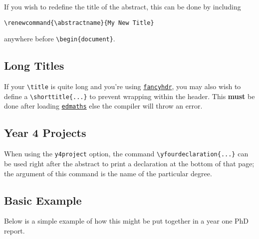 \documentclass[12pt]{article}
\newcommand\pkg[1]{\href{https://www.ctan.org/pkg/#1}{\color{teal}\lstinline{#1}}}
\newcommand\key[1]{{\color{orange}\lstinline|#1|}}
\begin{document}
If you wish to redefine the title of the abstract, this can be done by including
\begin{lstlisting}
\renewcommand{\abstractname}{My New Title}
\end{lstlisting}
anywhere before \lstinline|\begin{document}|.

\subsection{Long Titles}

If your \lstinline|\title| is quite long and you're using \pkg{fancyhdr}, you may also wish to define a \lstinline|\shorttitle{...}| to prevent wrapping within the header. This {\bf must} be done after loading \pkg{edmaths} else the compiler will throw an error.

\subsection{Year 4 Projects}

When using the \key{y4project} option, the command \lstinline|\yfourdeclaration{...}| can be used right after the abstract to print a declaration at the bottom of that page; the argument of this command is the name of the particular degree.

\subsection{Basic Example}

Below is a simple example of how this might be put together in a year one PhD report.
\end{document}

